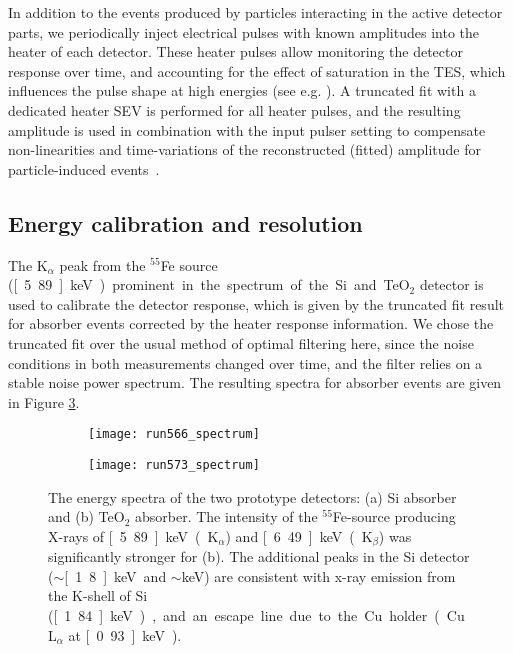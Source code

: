 \documentclass[superscriptaddress,nofootinbib ]{revtex4-2}
\begin{document}
In addition to the events produced by particles interacting in the active detector parts, we periodically inject electrical pulses with known amplitudes into the heater of each detector. These heater pulses allow monitoring the detector response over time, and accounting for the effect of saturation in the TES, which influences the pulse shape at high energies (see e.g. \cite{angloher_results_2017}). A truncated fit with a dedicated heater SEV is performed for all heater pulses, and the resulting amplitude is used in combination with the input pulser setting to compensate non-linearities and time-variations of the reconstructed (fitted) amplitude for particle-induced events~\cite{angloher_limits_2002}. 

\subsection{Energy calibration and resolution}

The K$_\alpha$ peak from the $^{55}$Fe source (\unit[5.89]{keV}) prominent in the spectrum of the Si and TeO$_2$ detector is used to calibrate the detector response, which is given by the truncated fit result for absorber events corrected by the heater response information. We chose the truncated fit over the usual method of optimal filtering \cite{gatti_processing_1986} here, since the noise conditions in both measurements changed over time, and the filter relies on a stable noise power spectrum. The resulting spectra for absorber events are given in Figure \ref{fig:spectrum}.   

\begin{figure}[!htb]
\centering
\begin{subfigure}[b]{0.49\textwidth}
   \texttt{[image: run566\_spectrum]}
   \caption{}
   \label{fig:spectrum566}
\end{subfigure}
\hfill
\begin{subfigure}[b]{0.49\textwidth}
   \texttt{[image: run573\_spectrum]}
   \caption{}
   \label{fig:spectrum573}
\end{subfigure}
  \caption{The energy spectra of the two prototype detectors: (a) Si absorber and (b) TeO$_2$ absorber. The intensity of the $^{55}$Fe-source producing X-rays of \unit[5.89]{keV} (K$_\alpha$) and \unit[6.49]{keV} (K$_\beta$) was significantly stronger for (b). The additional peaks in the Si detector ($\sim$\unit[1.8]{keV} and $\sim$\unit[5]{keV}) are consistent with x-ray emission from the K-shell of Si (\unit[1.84]{keV}), and an escape line due to the Cu holder (Cu L$_\alpha$ at \unit[0.93]{keV}).}
  \label{fig:spectrum}
\end{figure}
\end{document}
